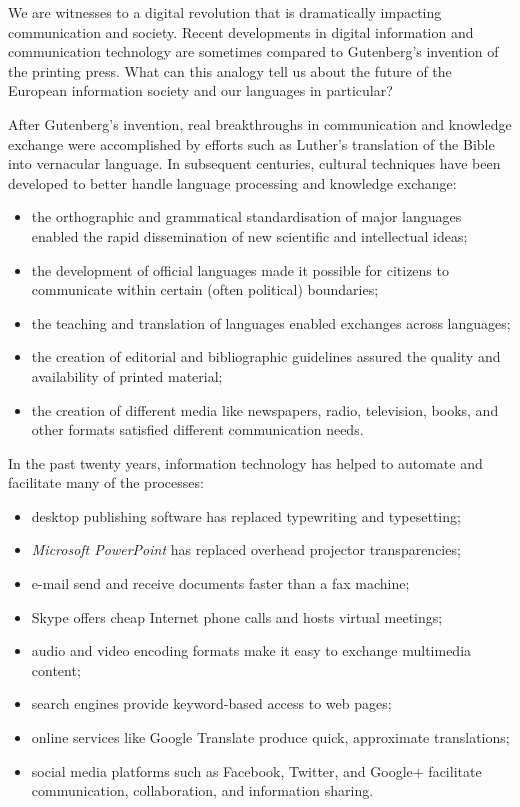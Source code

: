 \begin{multicols}{2}

    We are witnesses to a digital revolution that is dramatically impacting communication and society. Recent developments in digital information and communication technology are sometimes compared to Gutenberg’s invention of the printing press. What can this analogy tell us about the future of the European information society and our languages in particular?


    After Gutenberg’s invention, real breakthroughs in communication and knowledge exchange were accomplished by efforts such as Luther’s translation of the Bible into vernacular language. In subsequent centuries, cultural techniques have been developed to better handle language processing and knowledge exchange:
    
\begin{itemize}
      \item the orthographic and grammatical standardisation of major languages enabled the rapid dissemination of new 
      scientific and intellectual ideas;
      \item the development of official languages made it possible for citizens to communicate within certain (often 
      political) boundaries;
      \item the teaching and translation of languages enabled exchanges across languages;
      \item the creation of editorial and bibliographic guidelines assured the quality and availability of printed 
      material;
      \item the creation of different media like newspapers, radio, television, books, and other formats satisfied 
      different communication needs. 
\end{itemize}

In the past twenty years, information technology has helped to automate and facilitate many of the processes:

\begin{itemize}
      \item desktop publishing software has replaced typewriting and typesetting;
      \item \textit{Microsoft PowerPoint} has replaced overhead projector transparencies;
      \item e-mail send and receive documents faster than a fax machine;
      \item Skype offers cheap Internet phone calls and hosts virtual meetings;
      \item audio and video encoding formats make it easy to exchange multimedia content;
      \item search engines provide keyword-based access to web pages;
      \item online services like Google Translate produce quick, approximate translations;
      \item social media platforms such as Facebook, Twitter, and Google+ facilitate communication, collaboration, and information sharing.
\end{itemize}


\end{multicols}

